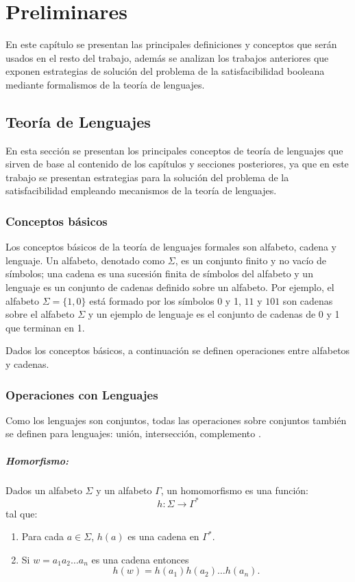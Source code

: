 \chapter{Preliminares}
\label{chap:preliminaries}

En este capítulo se presentan las principales definiciones y conceptos que serán usados en el resto del trabajo, además
se analizan los trabajos anteriores que exponen estrategias de solución del problema de la satisfacibilidad
booleana  mediante formalismos de la teoría de lenguajes.

\section{Teoría de Lenguajes}

En esta sección se presentan los principales conceptos de teoría de lenguajes que sirven de base al contenido de los 
capítulos y secciones posteriores, ya que en este trabajo se presentan estrategias para la solución del problema
de la satisfacibilidad empleando mecanismos de la teoría de lenguajes.

\subsection{Conceptos básicos}

Los conceptos básicos de la teoría de lenguajes formales son alfabeto, cadena y lenguaje. Un alfabeto, denotado 
como $\Sigma$, es un conjunto finito y no vacío de símbolos; una cadena es una sucesión finita de símbolos del alfabeto y 
un lenguaje es un conjunto de cadenas definido sobre un alfabeto. Por ejemplo, el 
alfabeto $\Sigma=\{1,0\}$ está formado por los símbolos 0 y 1, $11$ y $101$ son cadenas sobre el alfabeto $\Sigma$ y un ejemplo de lenguaje
es  el conjunto de cadenas de 0 y 1 que terminan en 1.

Dados los conceptos básicos, a continuación se definen operaciones entre alfabetos y cadenas.

\subsection{Operaciones con Lenguajes}

Como los lenguajes son conjuntos, todas las operaciones sobre conjuntos también se definen para lenguajes: unión, intersección, complemento \cite{authomataTheory}.

\paragraph{Homorfismo:} Dados un alfabeto \( \Sigma \) y un alfabeto \( \Gamma \), un homomorfismo es una función:
\[
  h: \Sigma \to \Gamma^*
\]
tal que:
\begin{enumerate}
  \item Para cada \( a \in \Sigma \), \( h(a) \) es una cadena en \( \Gamma^* \).
  \item Si $w=a_1a_2\ldots a_n$ es una cadena entonces
        $$h(w)=h(a_1)h(a_2)\ldots h(a_n).$$
\end{enumerate}

